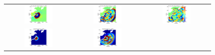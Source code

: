 \documentclass[review,12pt]{elsarticle}
\begin{document}
\begin{figure}[ht]
        \begin{tabular}{ccc}
\hspace*{-55pt}
\includegraphics[width=0.45\textwidth]{Figure9a.pdf} &
\hspace*{-45pt}
\includegraphics[width=0.45\textwidth]{Figure9b.pdf} &
\hspace*{-45pt}
\includegraphics[width=0.45\textwidth]{Figure9c.pdf} \\
\hspace*{-55pt}
\includegraphics[width=0.45\textwidth]{Figure9d.pdf} &
\hspace*{-45pt}
\includegraphics[width=0.45\textwidth]{Figure9e.pdf} &

\end{tabular}
\end{figure}
\end{document}
